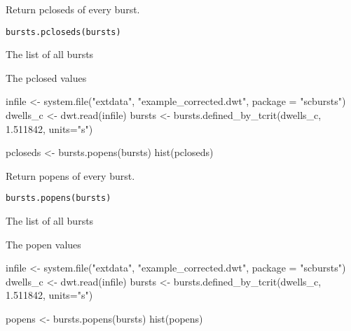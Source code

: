 \documentclass[letterpaper]{book}
\begin{document}
%
\begin{Description}\relax
Return pcloseds of every burst.
\end{Description}
%
\begin{Usage}
\begin{verbatim}
bursts.pcloseds(bursts)
\end{verbatim}
\end{Usage}
%
\begin{Arguments}
\begin{ldescription}
\item[\code{bursts}] The list of all bursts
\end{ldescription}
\end{Arguments}
%
\begin{Value}
The pclosed values
\end{Value}
%
\begin{Examples}
\begin{ExampleCode}

infile <- system.file("extdata", "example_corrected.dwt", package = "scbursts")
dwells_c <- dwt.read(infile)
bursts <- bursts.defined_by_tcrit(dwells_c, 1.511842, units="s")

pcloseds <- bursts.popens(bursts)
hist(pcloseds)

\end{ExampleCode}
\end{Examples}
%
\begin{Description}\relax
Return popens of every burst.
\end{Description}
%
\begin{Usage}
\begin{verbatim}
bursts.popens(bursts)
\end{verbatim}
\end{Usage}
%
\begin{Arguments}
\begin{ldescription}
\item[\code{bursts}] The list of all bursts
\end{ldescription}
\end{Arguments}
%
\begin{Value}
The popen values
\end{Value}
%
\begin{Examples}
\begin{ExampleCode}

infile <- system.file("extdata", "example_corrected.dwt", package = "scbursts")
dwells_c <- dwt.read(infile)
bursts <- bursts.defined_by_tcrit(dwells_c, 1.511842, units="s")

popens <- bursts.popens(bursts)
hist(popens)

\end{ExampleCode}
\end{Examples}
\end{document}
